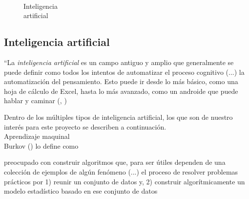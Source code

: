 \begin{wrapfigure}[9]{r}[0cm]{2.66cm}
	\caption[Inteligencia artificial]{\\Inteligencia\\artificial}\label{FIG:IA}
\end{wrapfigure}\subsection {Inteligencia artificial}\label{subsec:intela}
\begin{displayquote}
``La \emph{inteligencia artificial} es un campo antiguo y amplio que generalmente se puede definir como todos los intentos de automatizar el proceso cognitivo (...) la automatización del pensamiento. Esto puede ir desde lo más básico, como una hoja de cálculo de Excel, hasta lo más avanzado, como un androide que puede hablar y caminar (\citeauthor{cho18}, \citeyear{cho18})
\end{displayquote}

Dentro de los múltiples tipos de inteligencia artificial, los que son de nuestro interés para este proyecto se describen a continuación.\\

Aprendizaje maquinal\\
Burkov (\citeyear{burk19}) lo define como
\begin{displayquote}
preocupado con construir algoritmos que, para ser útiles dependen de una colección de ejemplos de algún fenómeno (...) el proceso de resolver problemas prácticos por 1) reunir un conjunto de datos y, 2) construir algorítmicamente un modelo estadístico basado en ese conjunto de datos
\end{displayquote}

